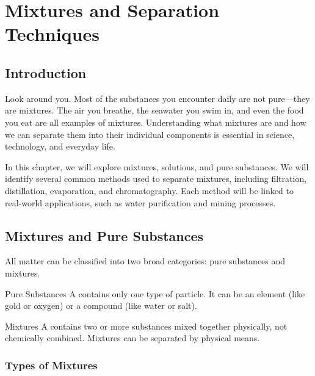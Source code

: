 \chapter{Mixtures and Separation Techniques}

\section{Introduction}

Look around you. Most of the substances you encounter daily are not pure—they are mixtures. The air you breathe, the seawater you swim in, and even the food you eat are all examples of mixtures. Understanding what mixtures are and how we can separate them into their individual components is essential in science, technology, and everyday life. 

In this chapter, we will explore mixtures, solutions, and pure substances. We will identify several common methods used to separate mixtures, including filtration, distillation, evaporation, and chromatography. Each method will be linked to real-world applications, such as water purification and mining processes.

\section{Mixtures and Pure Substances}

All matter can be classified into two broad categories: pure substances and mixtures.

\begin{keyconcept}{Pure Substances}
A  contains only one type of particle. It can be an element (like gold or oxygen) or a compound (like water or salt).
\end{keyconcept}

\begin{keyconcept}{Mixtures}
A  contains two or more substances mixed together physically, not chemically combined. Mixtures can be separated by physical means.
\end{keyconcept}


\subsection{Types of Mixtures}

